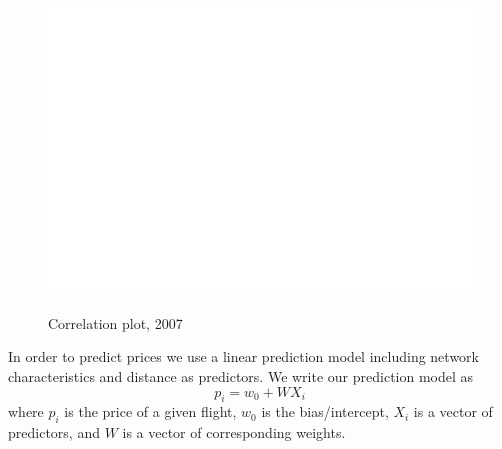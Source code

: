 \begin{figure}[H]
  \centering
  \caption{Correlation plot, 2007}
    \includegraphics[width=1. \textwidth]{Exam/Figures/corr_plot.pdf}
  \label{fig:map_general}
\end{figure}


In order to predict prices we use a linear prediction model including network characteristics and distance as predictors.
We write our prediction model as
$$
p_i = w_0 + W X_i 
$$
where $p_i$ is the price of a given flight, $w_0$ is the bias/intercept, $X_i$ is a vector of predictors, and $W$ is a vector of corresponding weights. 

